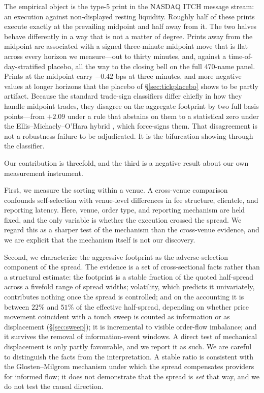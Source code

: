 \documentclass[11pt]{article}
\begin{document}
The empirical object is the type-5 print in the NASDAQ ITCH message stream: an execution
against non-displayed resting liquidity. Roughly half of these prints execute exactly at
the prevailing midpoint and half away from it. The two halves behave differently in a way
that is not a matter of degree. Prints away from the midpoint are associated with a signed
three-minute midpoint move that is flat across every horizon we measure---out to thirty
minutes, and, against a time-of-day-stratified placebo, all the way to the closing bell on
the full 470-name panel. Prints at the midpoint
carry $-0.42$ bps at three minutes, and more negative values at longer horizons that the
placebo of \S\ref{sec:tickplacebo} shows to be partly artifact. Because the standard trade-sign
classifiers differ chiefly in how they handle midpoint trades, they disagree on the
aggregate footprint by two full basis points---from $+2.09$ under a rule that abstains on
them to a statistical zero under the Ellis--Michaely--O'Hara hybrid \citep{ellis2000},
which force-signs them. That disagreement is not a robustness failure to be adjudicated. It is the
bifurcation showing through the classifier.

Our contribution is threefold, and the third is a negative result about our own measurement
instrument.

First, we measure the sorting within a venue. A cross-venue comparison confounds
self-selection with venue-level differences in fee structure, clientele, and reporting
latency. Here, venue, order type, and reporting mechanism are held fixed, and the only
variable is whether the execution crossed the spread. We regard this as a sharper test of
the \citet{zhu2014} mechanism than the cross-venue evidence, and we are explicit that the
mechanism itself is not our discovery.

Second, we characterize the aggressive footprint as the adverse-selection component of the
spread. The evidence is a set of cross-sectional facts rather than a structural estimate:
the footprint is a stable fraction of the quoted half-spread across a fivefold range of
spread widths; volatility, which predicts it univariately, contributes nothing once the
spread is controlled; and on the \citet{huangstoll1997} accounting it is between $22\%$ and
$51\%$ of the effective half-spread, depending on whether price movement coincident with a
touch sweep is counted as information or as displacement (\S\ref{sec:sweep}); it is incremental to visible order-flow imbalance; and
it survives the removal of information-event windows. A direct test of
mechanical displacement is only partly favourable, and we report it as such. We are careful to distinguish the facts from the
interpretation. A stable ratio is consistent with the Glosten--Milgrom mechanism \citep{glosten1985} under
which the spread compensates providers for informed flow; it does not demonstrate that the
spread is \emph{set} that way, and we do not test the causal direction.
\end{document}
